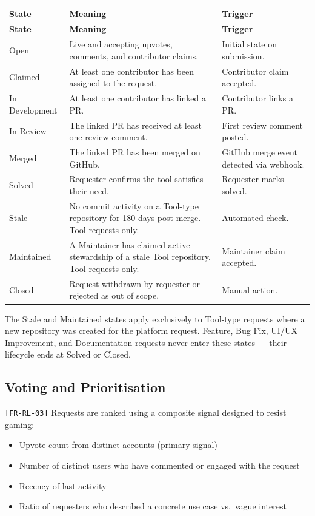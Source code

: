 \documentclass[12pt,a4paper]{article}
\begin{document}
\begin{longtable}{L{3cm} L{5.3cm} L{5cm}}
  \color{white}\bfseries State & \color{white}\bfseries Meaning & \color{white}\bfseries Trigger \\
  \endfirsthead
  \color{white}\bfseries State & \color{white}\bfseries Meaning & \color{white}\bfseries Trigger \\
  \endhead\hline
  Open           & Live and accepting upvotes, comments, and contributor claims. & Initial state on submission. \\
  Claimed        & At least one contributor has been assigned to the request. & Contributor claim accepted. \\
  In Development & At least one contributor has linked a PR. & Contributor links a PR. \\
  In Review      & The linked PR has received at least one review comment. & First review comment posted. \\
  Merged         & The linked PR has been merged on GitHub. & GitHub merge event detected via webhook. \\
  Solved         & Requester confirms the tool satisfies their need. & Requester marks solved. \\
  Stale          & No commit activity on a Tool-type repository for 180 days post-merge. Tool requests only. & Automated check. \\
  Maintained     & A Maintainer has claimed active stewardship of a stale Tool repository. Tool requests only. & Maintainer claim accepted. \\
  Closed         & Request withdrawn by requester or rejected as out of scope. & Manual action. \\
  \hline
\end{longtable}

\begin{infobox}
The Stale and Maintained states apply exclusively to Tool-type requests where a new repository was created for the platform request. Feature, Bug Fix, UI/UX Improvement, and Documentation requests never enter these states --- their lifecycle ends at Solved or Closed.
\end{infobox}

\subsection{Voting and Prioritisation}
\texttt{[FR-RL-03]} Requests are ranked using a composite signal designed to resist gaming:
\begin{itemize}
  \item Upvote count from distinct accounts (primary signal)
  \item Number of distinct users who have commented or engaged with the request
  \item Recency of last activity
  \item Ratio of requesters who described a concrete use case vs.\ vague interest
\end{itemize}
\end{document}

